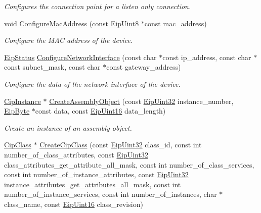\begin{DoxyCompactItemize}
\begin{DoxyCompactList}\small\item\em \-Configures the connection point for a listen only connection. \end{DoxyCompactList}\item 
void \hyperlink{group__CIP__API_ga33c5edc60fb8c9b878647ae5e3c03bc5}{\-Configure\-Mac\-Address} (const \hyperlink{typedefs_8h_aa0c108ee762a27720919a4634643040e}{\-Eip\-Uint8} $\ast$const mac\-\_\-address)
\begin{DoxyCompactList}\small\item\em \-Configure the \-M\-A\-C address of the device. \end{DoxyCompactList}\item 
\hyperlink{typedefs_8h_a3dcc5f7837c120360f8cc88a76781709}{\-Eip\-Status} \hyperlink{group__CIP__API_ga1f4f417cb95e75c439edabe7b8b91477}{\-Configure\-Network\-Interface} (const char $\ast$const ip\-\_\-address, const char $\ast$const subnet\-\_\-mask, const char $\ast$const gateway\-\_\-address)
\begin{DoxyCompactList}\small\item\em \-Configure the data of the network interface of the device. \end{DoxyCompactList}\item 
\hyperlink{ciptypes_8h_aea7976be629e5ece275c993982186188}{\-Cip\-Instance} $\ast$ \hyperlink{group__CIP__API_gae61b613fed863d30428e78b2311bf593}{\-Create\-Assembly\-Object} (const \hyperlink{typedefs_8h_abf2dd49262551294eb990ef8746a2767}{\-Eip\-Uint32} instance\-\_\-number, \hyperlink{typedefs_8h_a168bac8db7e7e6d944700e1ac4717ae3}{\-Eip\-Byte} $\ast$const data, const \hyperlink{typedefs_8h_ac1b4cfa25b4f5def62f23b455dd395d8}{\-Eip\-Uint16} data\-\_\-length)
\begin{DoxyCompactList}\small\item\em \-Create an instance of an assembly object. \end{DoxyCompactList}\item 
\hyperlink{ciptypes_8h_a175191808b8fac50b47d9bbc9edc6051}{\-Cip\-Class} $\ast$ \hyperlink{group__CIP__API_ga446b7f612fe7baaf40d7f87274832922}{\-Create\-Cip\-Class} (const \hyperlink{typedefs_8h_abf2dd49262551294eb990ef8746a2767}{\-Eip\-Uint32} class\-\_\-id, const int number\-\_\-of\-\_\-class\-\_\-attributes, const \hyperlink{typedefs_8h_abf2dd49262551294eb990ef8746a2767}{\-Eip\-Uint32} class\-\_\-attributes\-\_\-get\-\_\-attribute\-\_\-all\-\_\-mask, const int number\-\_\-of\-\_\-class\-\_\-services, const int number\-\_\-of\-\_\-instance\-\_\-attributes, const \hyperlink{typedefs_8h_abf2dd49262551294eb990ef8746a2767}{\-Eip\-Uint32} instance\-\_\-attributes\-\_\-get\-\_\-attributes\-\_\-all\-\_\-mask, const int number\-\_\-of\-\_\-instance\-\_\-services, const int number\-\_\-of\-\_\-instances, char $\ast$class\-\_\-name, const \hyperlink{typedefs_8h_ac1b4cfa25b4f5def62f23b455dd395d8}{\-Eip\-Uint16} class\-\_\-revision)

\end{DoxyCompactItemize}
